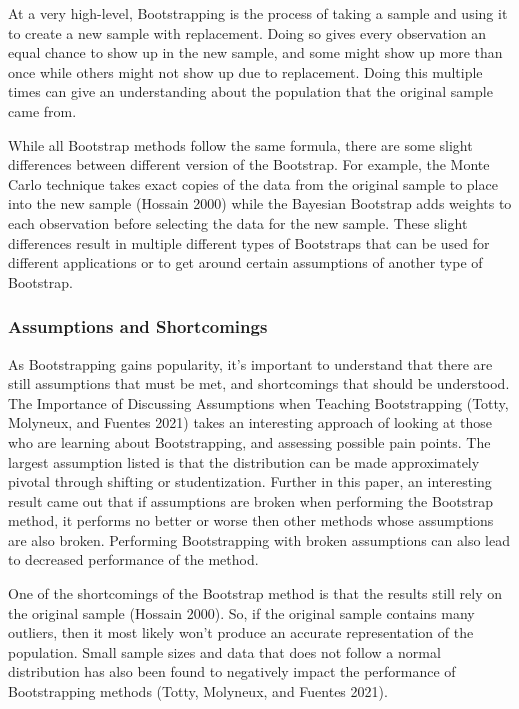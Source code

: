 \documentclass[
  letterpaper,
  DIV=11,
  numbers=noendperiod]{scrartcl}
\begin{document}
At a very high-level, Bootstrapping is the process of taking a sample
and using it to create a new sample with replacement. Doing so gives
every observation an equal chance to show up in the new sample, and some
might show up more than once while others might not show up due to
replacement. Doing this multiple times can give an understanding about
the population that the original sample came from.

While all Bootstrap methods follow the same formula, there are some
slight differences between different version of the Bootstrap. For
example, the Monte Carlo technique takes exact copies of the data from
the original sample to place into the new sample (Hossain 2000) while
the Bayesian Bootstrap adds weights to each observation before selecting
the data for the new sample. These slight differences result in multiple
different types of Bootstraps that can be used for different
applications or to get around certain assumptions of another type of
Bootstrap.

\hypertarget{assumptions-and-shortcomings}{%
\subsubsection{Assumptions and
Shortcomings}\label{assumptions-and-shortcomings}}

As Bootstrapping gains popularity, it's important to understand that
there are still assumptions that must be met, and shortcomings that
should be understood. The Importance of Discussing Assumptions when
Teaching Bootstrapping (Totty, Molyneux, and Fuentes 2021) takes an
interesting approach of looking at those who are learning about
Bootstrapping, and assessing possible pain points. The largest
assumption listed is that the distribution can be made approximately
pivotal through shifting or studentization. Further in this paper, an
interesting result came out that if assumptions are broken when
performing the Bootstrap method, it performs no better or worse then
other methods whose assumptions are also broken. Performing
Bootstrapping with broken assumptions can also lead to decreased
performance of the method.

One of the shortcomings of the Bootstrap method is that the results
still rely on the original sample (Hossain 2000). So, if the original
sample contains many outliers, then it most likely won't produce an
accurate representation of the population. Small sample sizes and data
that does not follow a normal distribution has also been found to
negatively impact the performance of Bootstrapping methods (Totty,
Molyneux, and Fuentes 2021).
\end{document}

